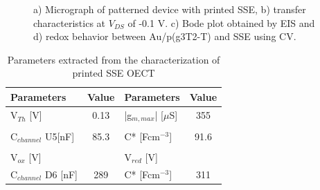 \begin{figure}[ht]
    \centering
    \qquad
    \caption[Performance of solid-OECT with printed SSE]{a) Micrograph of patterned device with printed SSE, b) transfer characteristics at $V_{DS}$ of -0.1 V. c) Bode plot obtained by EIS and d) redox behavior between Au/p(g3T2-T) and SSE using CV.}
    \label{fig:printedSSE}
\end{figure}



\begin{table}[ht]
\centering
\caption{Parameters extracted from the characterization of printed SSE OECT}
\begin{tabular}{l|c||l|c}
Parameters & Value & Parameters & Value \\\hline \hline
V$_{Th}$ [V] &  0.13 & |g$_{m,max}$| [$\mu$S] & 355 \\
& & &\\[-1em]
C$_{channel}$ U5[nF] & 85.3 & C* [Fcm$^{-3}$] & 91.6 \\
& & &\\[-1em]
V$_{ox}$ [V] &  & V$_{red}$ [V] &  \\\hline
C$_{channel}$ D6 [nF] & 289 & C* [Fcm$^{-3}$] & 311 \\\hline
\end{tabular}
\label{tab:printedfom}
\end{table}


